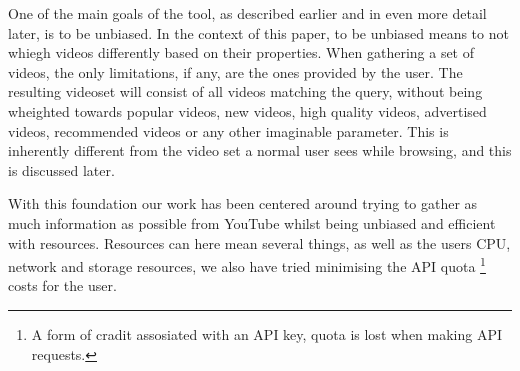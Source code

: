 One of the main goals of the tool, as described earlier and in even more detail
later, is to be unbiased. In the context of this paper, to be unbiased means
to not whiegh videos differently based on their properties. When gathering a
set of videos, the only limitations, if any, are the ones provided by the user.
The resulting videoset will consist of all videos matching the query, without
being wheighted towards popular videos, new videos, high quality videos, 
advertised videos, recommended videos or any other imaginable parameter. This
is inherently different from the video set a normal user sees while browsing, 
and this is discussed later.

With this foundation our work has been centered around trying to gather as much
information as possible from YouTube whilst being unbiased and efficient with
resources. Resources can here mean several things, as well as the users CPU,
network and storage resources, we also have tried minimising the API quota
\footnote{A form of cradit assosiated with an API key, quota is lost when making
API requests.} costs for the user.


